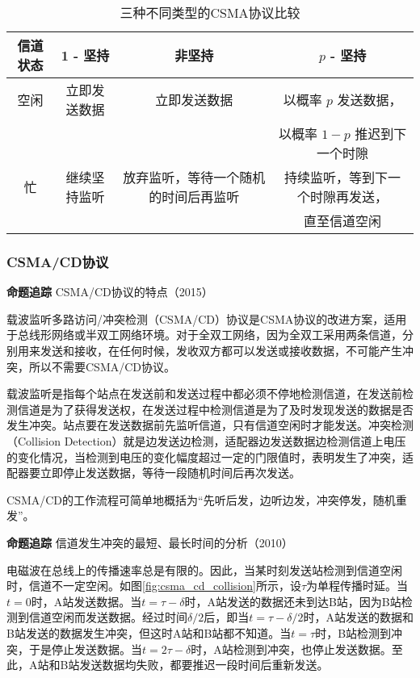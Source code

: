 \documentclass{ctexbook}
\begin{document}
	\begin{table}[h]
		\centering
		\caption{三种不同类型的CSMA协议比较}
		\label{table:csma_comparison}
		\begin{tabular}{ccc c} %
			\toprule
			信道状态 & 1 - 坚持 & 非坚持 & $p$ - 坚持 \\
			\midrule
			空闲 
			& 立即发送数据 
			& 立即发送数据 
			& 以概率 $p$ 发送数据，\\
			&       &       & 以概率 $1 - p$ 推迟到下一个时隙 \\
			忙 
			& 继续坚持监听 
			& 放弃监听，等待一个随机的时间后再监听 
			& 持续监听，等到下一个时隙再发送，\\
			&       &       & 直至信道空闲 \\
			\bottomrule
		\end{tabular}
	\end{table}
	
	\subsubsection{CSMA/CD协议}
	\begin{tcolorbox}[colframe=black, colback=white]
		\kaishu \textbf{命题追踪} \quad CSMA/CD协议的特点（2015）
	\end{tcolorbox}
	载波监听多路访问/冲突检测（CSMA/CD）协议是CSMA协议的改进方案，适用于总线形网络或半双工网络环境。对于全双工网络，因为全双工采用两条信道，分别用来发送和接收，在任何时候，发收双方都可以发送或接收数据，不可能产生冲突，所以不需要CSMA/CD协议。
	
	载波监听是指每个站点在发送前和发送过程中都必须不停地检测信道，在发送前检测信道是为了获得发送权，在发送过程中检测信道是为了及时发现发送的数据是否发生冲突。站点要在发送数据前先监听信道，只有信道空闲时才能发送。冲突检测（Collision Detection）就是边发送边检测，适配器边发送数据边检测信道上电压的变化情况，当检测到电压的变化幅度超过一定的门限值时，表明发生了冲突，适配器要立即停止发送数据，等待一段随机时间后再次发送。
	
	CSMA/CD的工作流程可简单地概括为“先听后发，边听边发，冲突停发，随机重发”。
	
	\begin{tcolorbox}[colframe=black, colback=white]
		\kaishu \textbf{命题追踪} \quad 信道发生冲突的最短、最长时间的分析（2010）
	\end{tcolorbox}
	电磁波在总线上的传播速率总是有限的。因此，当某时刻发送站检测到信道空闲时，信道不一定空闲。如图\ref{fig:csma_cd_collision}所示，设$\tau$为单程传播时延。当$t = 0$时，A站发送数据。当$t = \tau - \delta$时，A站发送的数据还未到达B站，因为B站检测到信道空闲而发送数据。经过时间$\delta/2$后，即当$t = \tau - \delta/2$时，A站发送的数据和B站发送的数据发生冲突，但这时A站和B站都不知道。当$t = \tau$时，B站检测到冲突，于是停止发送数据。当$t = 2\tau - \delta$时，A站检测到冲突，也停止发送数据。至此，A站和B站发送数据均失败，都要推迟一段时间后重新发送。
	
\end{document}
